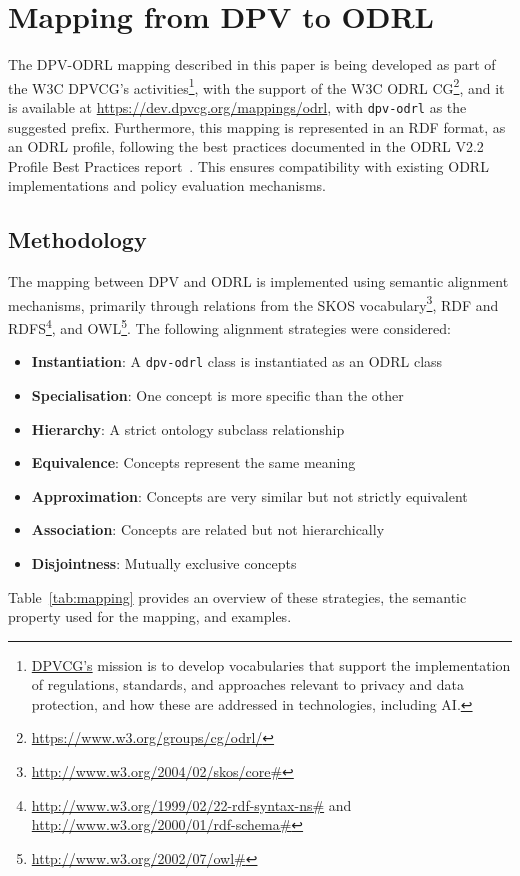 \section{Mapping from DPV to ODRL}
\label{sec:mapping}

The DPV-ODRL mapping described in this paper
is being developed as part of the W3C DPVCG's activities\footnote{
    \href{https://www.w3.org/groups/cg/dpvcg/}{DPVCG's} mission is to develop vocabularies
    that support the implementation of regulations,
    standards, and approaches relevant to privacy and data protection,
    and how these are addressed in technologies, including AI.},
with the support of the W3C ODRL CG\footnote{
    \url{https://www.w3.org/groups/cg/odrl/}},
and it is available at \url{https://dev.dpvcg.org/mappings/odrl},
with \texttt{dpv-odrl} as the suggested prefix.
Furthermore,
this mapping is represented in an RDF format,
as an ODRL profile,
following the best practices documented in the
ODRL V2.2 Profile Best Practices report~\cite{steidl_odrl_2023}. 
This ensures compatibility with existing ODRL implementations
and policy evaluation mechanisms.

\subsection{Methodology}
\label{sec:methodology}

The mapping between DPV and ODRL is implemented
using semantic alignment mechanisms,
primarily through relations from the SKOS vocabulary\footnote{
    \url{http://www.w3.org/2004/02/skos/core\#}},
RDF and RDFS\footnote{
    \url{http://www.w3.org/1999/02/22-rdf-syntax-ns\#} and
    \url{http://www.w3.org/2000/01/rdf-schema\#}}, and
OWL\footnote{
    \url{http://www.w3.org/2002/07/owl\#}}.
The following alignment strategies were considered:
\begin{itemize}
    \item \textbf{Instantiation}: A \texttt{dpv-odrl} class is instantiated as an ODRL class
    \item \textbf{Specialisation}: One concept is more specific than the other
    \item \textbf{Hierarchy}: A strict ontology subclass relationship
    \item \textbf{Equivalence}: Concepts represent the same meaning
    \item \textbf{Approximation}: Concepts are very similar but not strictly equivalent
    \item \textbf{Association}: Concepts are related but not hierarchically
    \item \textbf{Disjointness}: Mutually exclusive concepts
\end{itemize}
Table~\ref{tab:mapping} provides an overview of these strategies,
the semantic property used for the mapping,
and examples.

